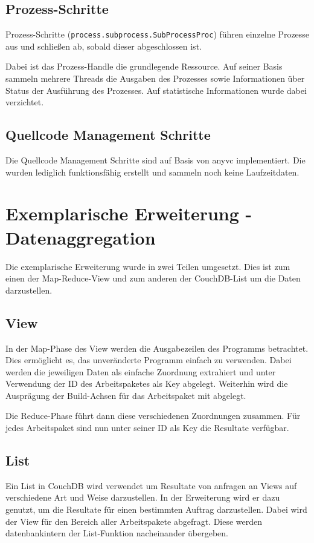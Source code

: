 \subsection{Prozess-Schritte}

Prozess-Schritte (\verb|process.subprocess.SubProcessProc|)
führen einzelne Prozesse aus und schließen ab, sobald dieser
abgeschlossen ist.

Dabei ist das Prozess-Handle die grundlegende Ressource.
Auf seiner Basis sammeln mehrere Threads die Ausgaben des Prozesses sowie Informationen über Status der Ausführung des Prozesses.
Auf statistische Informationen wurde dabei verzichtet.

\subsection{Quellcode Management Schritte}

Die Quellcode Management Schritte sind auf Basis von anyvc \cite{anyvc:website} implementiert. Die wurden lediglich funktionsfähig erstellt und sammeln noch keine Laufzeitdaten.

\section{Exemplarische Erweiterung - Datenaggregation}
\label{sec:imp:extension}

Die exemplarische Erweiterung wurde in zwei Teilen umgesetzt.
Dies ist zum einen der Map-Reduce-View und zum anderen der CouchDB-List um die Daten darzustellen.

\subsection{View}

In der Map-Phase des View werden die Ausgabezeilen des Programms betrachtet.
Dies ermöglicht es, das unveränderte Programm einfach zu verwenden.
Dabei werden die jeweiligen Daten als einfache Zuordnung extrahiert
und unter Verwendung der ID des Arbeitspaketes als Key abgelegt.
Weiterhin wird die Ausprägung der Build-Achsen für das Arbeitspaket mit abgelegt.

Die Reduce-Phase führt dann diese verschiedenen Zuordnungen zusammen.
Für jedes Arbeitspaket sind nun unter seiner ID als Key die Resultate verfügbar.

\subsection{List}
Ein List in CouchDB wird verwendet um Resultate von anfragen an Views auf verschiedene Art und Weise darzustellen. In der Erweiterung wird er dazu genutzt, um die Resultate für einen bestimmten Auftrag darzustellen.
Dabei wird der View für den Bereich aller Arbeitspakete abgefragt.
Diese werden datenbankintern der List-Funktion nacheinander übergeben.

